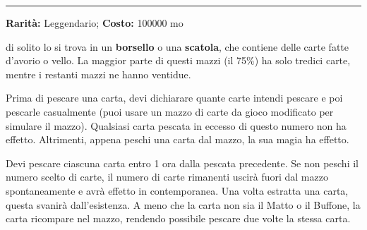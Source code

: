 \begin{multicols}{2}
\smallskip\noindent\rule{\linewidth}{2pt}  \hypertarget{MazzodelleMeraviglie}{}\medskip{}\noindent\label{MazzodelleMeraviglie}

\textbf{Rarità:} Leggendario; \textbf{Costo:} 100000 mo

di solito lo si trova in un \textbf{borsello} o una \textbf{scatola}, che contiene delle carte fatte d'avorio o vello. La maggior parte di questi mazzi (il 75\%) ha solo tredici carte, mentre i restanti mazzi ne hanno ventidue.

Prima di pescare una carta, devi dichiarare quante carte intendi pescare e poi pescarle casualmente (puoi usare un mazzo di carte da gioco modificato per simulare il mazzo). Qualsiasi carta pescata in eccesso di questo numero non ha effetto. Altrimenti, appena peschi una carta dal mazzo, la sua magia ha effetto.

Devi pescare ciascuna carta entro 1 ora dalla pescata precedente. Se non peschi il numero scelto di carte, il numero di carte rimanenti uscirà fuori dal mazzo spontaneamente e avrà effetto in contemporanea. Una volta estratta una carta, questa svanirà dall'esistenza. A meno che la carta non sia il Matto o il Buffone, la carta ricompare nel mazzo, rendendo possibile pescare due volte la stessa carta.

\medskip


\end{multicols}
